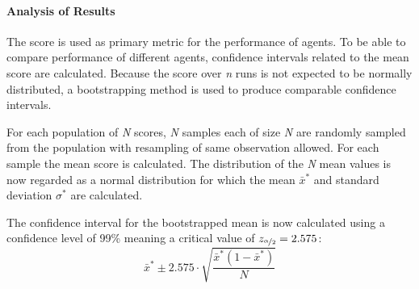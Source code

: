 \documentclass[12pt, fleqn]{article}
\begin{document}
\paragraph{Analysis of Results}
The score is used as primary metric for the performance of agents. To be able to compare performance of different agents, confidence intervals related to the mean score are calculated. Because the score over \textit{n} runs is not expected to be normally distributed, a bootstrapping method is used to produce comparable confidence intervals.

For each population of \textit{N} scores, \textit{N} samples each of size \textit{N} are randomly sampled from the population with resampling of same observation allowed. For each sample the mean score  is calculated. The distribution of the \textit{N} mean values is now regarded as a normal distribution for which the mean $\bar{x}^*$ and standard deviation $\sigma^*$ are calculated.

The confidence interval for the bootstrapped mean is now calculated using a confidence level of 99\% meaning a critical value of $z_{\nicefrac{\alpha}{2}}=2.575$:
\begin{equation}\label{key}
\bar{x}^* \pm 2.575\cdot  \sqrt{\frac{\bar{x}^*(1-\bar{x}^*)}{N}}
\end{equation}
\end{document}
